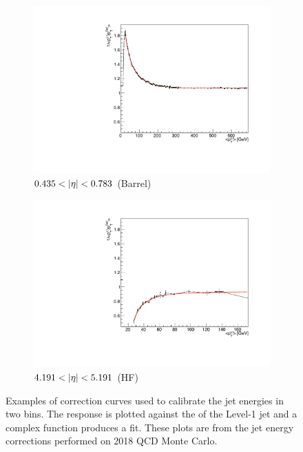 \begin{figure}[htbp]
    \centering
    \begin{subfigure}[b]{0.45\textwidth}
        \includegraphics[width=\textwidth]{./figures/jecs//corrCurveBarrel.pdf}
        \caption{$0.435 < \lvert \eta \rvert < 0.783$ (Barrel)}
        \label{fig:detector_jecs_corr_curve_Barrel}
    \end{subfigure}
    \hfill
    \begin{subfigure}[b]{0.45\textwidth}
        \includegraphics[width=\textwidth]{./figures/jecs/corrCurveHF.pdf}
        \caption{$4.191 < \lvert \eta \rvert < 5.191$ (HF)}
        \label{fig:detector_jecs_corr_curve_HF}
    \end{subfigure}
\caption[Examples of correction curves used to calibrate the jet energies in two \abseta bins]{Examples of correction curves used to calibrate the jet energies in two \abseta bins. The response is plotted against the \pt of the Level-1 jet and a complex function produces a fit. These plots are from the jet energy corrections performed on 2018 QCD Monte Carlo.}
\label{fig:detector_jecs_corr_curves}
\end{figure}

